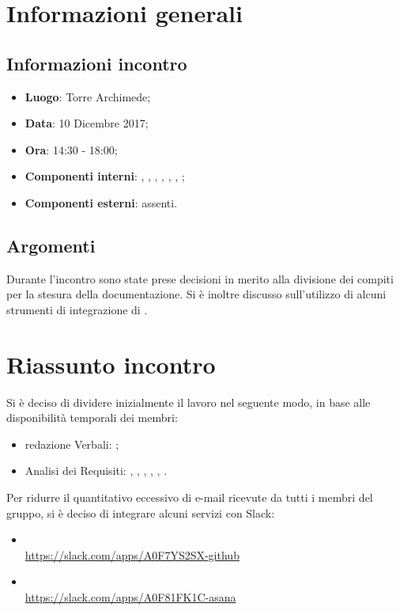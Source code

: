 \section{Informazioni generali}
\subsection{Informazioni incontro}
\begin{itemize}
\item \textbf{Luogo}: Torre Archimede;
\item \textbf{Data}: 10 Dicembre 2017;
\item \textbf{Ora}: 14:30 - 18:00;
\item \textbf{Componenti interni}: \Tommaso, \Carlo, \Mattia, \Luca, \Cristian, \Isacco, \Leonardo;
\item \textbf{Componenti esterni}: assenti.
\end{itemize}

\subsection{Argomenti}
Durante l'incontro sono state prese decisioni in merito alla divisione dei compiti per la stesura della documentazione.
Si è inoltre discusso sull'utilizzo di alcuni strumenti di integrazione di .

\section{Riassunto incontro}
Si è deciso di dividere inizialmente il lavoro nel seguente modo, in base alle disponibilità temporali dei membri:
\begin{itemize}
    \item redazione Verbali: \Leonardo;
    \item Analisi dei Requisiti: \Tommaso, \Mattia, \Isacco, \Carlo, \Luca, \Cristian.
\end{itemize}

Per ridurre il quantitativo eccessivo di e-mail ricevute da tutti i membri del gruppo, si è deciso di integrare alcuni servizi con Slack:
\begin{itemize}
    \item {} \\ \url{https://slack.com/apps/A0F7YS2SX-github}
    \item {} \\ \url{https://slack.com/apps/A0F81FK1C-asana}
\end{itemize}

